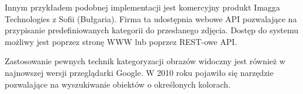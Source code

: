 Innym przykładem podobnej implementacji jest komercyjny produkt Imagga Technologies z Sofii (Bułgaria). Firma ta udostępnia webowe API pozwalające na przypisanie predefiniowanych kategorii do przesłanego zdjęcia. Dostęp do systemu możliwy jest poprzez stronę WWW lub poprzez REST-owe API.\cite{IMAGGA}

Zastosowanie pewnych technik kategoryzacji obrazów widoczny jest również w najnowszej wersji przeglądarki Google. W 2010 roku pojawiło się narzędzie pozwalające na wyszukiwanie obiektów o określonych kolorach.\cite{Google2010}



